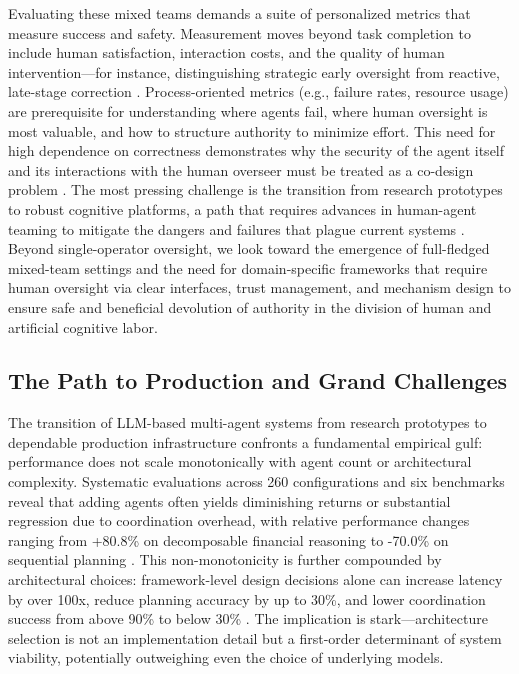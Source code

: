 \documentclass[11pt,a4paper]{article}
\begin{document}
Evaluating these mixed teams demands a suite of personalized metrics that measure success and safety. Measurement moves beyond task completion to include human satisfaction, interaction costs, and the quality of human intervention---for instance, distinguishing strategic early oversight from reactive, late-stage correction \cite{arxiv:2505.00753v5}. Process-oriented metrics (e.g., failure rates, resource usage) are prerequisite for understanding where agents fail, where human oversight is most valuable, and how to structure authority to minimize effort. This need for high dependence on correctness demonstrates why the security of the agent itself and its interactions with the human overseer must be treated as a co-design problem \cite{arxiv:2411.09523v1}. The most pressing challenge is the transition from research prototypes to robust cognitive platforms, a path that requires advances in human-agent teaming to mitigate the dangers and failures that plague current systems \cite{arxiv:2503.09648v1,arxiv:2412.05449v1}. Beyond single-operator oversight, we look toward the emergence of full-fledged mixed-team settings and the need for domain-specific frameworks that require human oversight via clear interfaces, trust management, and mechanism design to ensure safe and beneficial devolution of authority in the division of human and artificial cognitive labor.


\subsection{The Path to Production and Grand Challenges}


The transition of LLM-based multi-agent systems from research prototypes to dependable production infrastructure confronts a fundamental empirical gulf: performance does not scale monotonically with agent count or architectural complexity. Systematic evaluations across 260 configurations and six benchmarks reveal that adding agents often yields diminishing returns or substantial regression due to coordination overhead, with relative performance changes ranging from +80.8\% on decomposable financial reasoning to -70.0\% on sequential planning \cite{arxiv:2512.08296v3}. This non-monotonicity is further compounded by architectural choices: framework-level design decisions alone can increase latency by over 100x, reduce planning accuracy by up to 30\%, and lower coordination success from above 90\% to below 30\% \cite{arxiv:2602.03128v1}. The implication is stark---architecture selection is not an implementation detail but a first-order determinant of system viability, potentially outweighing even the choice of underlying models.
\end{document}
